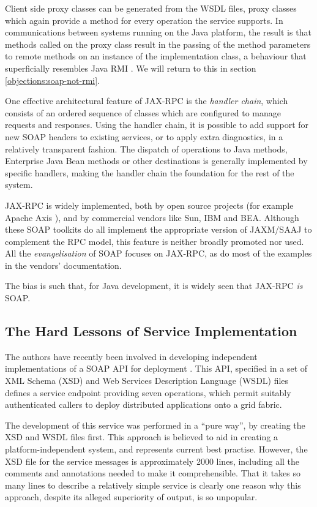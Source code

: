 Client side proxy classes can be generated from the WSDL files, proxy
classes which again provide a method for every operation the service
supports. In communications between systems running on the Java
platform, the result is that methods called on the proxy class result
in the passing of the method parameters to remote methods on an
instance of the implementation class, a behaviour that superficially
resembles Java RMI \cite{paper:RMI}. We will return to this in section
\ref{objections:soap-not-rmi}.

One effective architectural feature of JAX-RPC is the \emph{handler chain},
which consists of an ordered sequence of classes which are configured
to manage requests and responses. Using the handler chain, it is
possible to add support for new SOAP headers to existing services, or
to apply extra diagnostics, in a relatively transparent fashion. The
dispatch of operations to Java methods, Enterprise Java Bean methods
or other destinations is generally implemented by specific handlers,
making the handler chain the foundation for the rest of the system.

JAX-RPC is widely implemented, both by open source projects (for
example Apache Axis \cite{apache:axis}), and by commercial vendors
like Sun, IBM and BEA. Although these SOAP toolkits do all implement
the appropriate version of JAXM/SAAJ to complement the RPC model, this
feature is neither broadly promoted nor used. All the
\emph{evangelisation} of SOAP focuses on JAX-RPC, as do most of the
examples in the vendors' documentation.

The bias is such that, for Java development, it is widely seen that
JAX-RPC \emph{is} SOAP.

\subsection{The Hard Lessons of Service Implementation}
\label{intro:experience}

The authors have recently been involved in developing independent
implementations of a SOAP API for deployment \cite{draft:CDDLM}. This
API, specified in a set of XML Schema (XSD) \cite{spec:XSD} and Web
Services Description Language (WSDL) files \cite{spec:WSDL-11} defines
a service endpoint providing seven operations, which permit suitably
authenticated callers to deploy distributed applications onto a grid
fabric.

The development of this service was performed in a ``pure way'', by
creating the XSD and WSDL files first. This approach is believed to
aid in creating a platform-independent system, and represents current
best practise. However, the XSD file for the service messages is
approximately 2000 lines, including all the comments and annotations
needed to make it comprehensible. That it takes so many lines to
describe a relatively simple service is clearly one reason why this
approach, despite its alleged superiority of output, is so unpopular.

